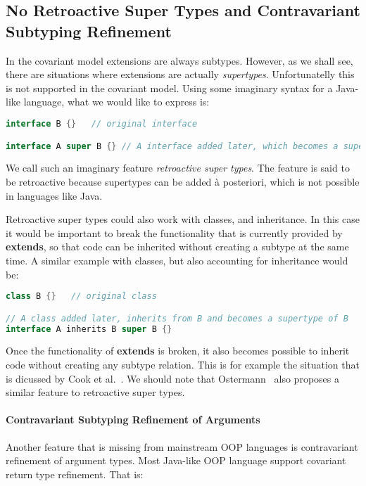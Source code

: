 \subsection{No Retroactive Super Types and Contravariant Subtyping Refinement}

In the covariant model extensions are always subtypes. However, as we
shall see, there are situations where extensions are actually
\emph{supertypes}. Unfortunatelly this is not supported in the
covariant model. Using some imaginary syntax for a Java-like language, 
what we would like to express is:

\begin{lstlisting}[language=java]
interface B {}   // original interface

interface A super B {} // A interface added later, which becomes a supertype of B
\end{lstlisting}

\noindent We call such an imaginary feature \emph{retroactive super
  types}. The feature is said to be retroactive because supertypes can
be added \`a posteriori, which is not possible in languages like Java.

Retroactive super types could also work with classes, and
inheritance. In this case it would be important to break the
functionality that is currently provided by {\bf extends}, so that 
code can be inherited without creating a subtype at the same time. 
A similar example with classes, but also accounting for inheritance 
would be:

\begin{lstlisting}[language=java]
class B {}   // original class

// A class added later, inherits from B and becomes a supertype of B
interface A inherits B super B {} 
\end{lstlisting}

\noindent Once the functionality of {\bf extends} is broken, it also
becomes possible to inherit code without creating any subtype
relation. This is for example the situation that is dicussed by Cook
et al.~\cite{}. We should note that Ostermann~\cite{}
also proposes a similar feature to retroactive super types.

\paragraph{Contravariant Subtyping Refinement of Arguments}
Another feature that is missing from mainstream OOP languages is 
contravariant refinement of argument types. Most Java-like OOP language support covariant return type 
refinement. That is:

